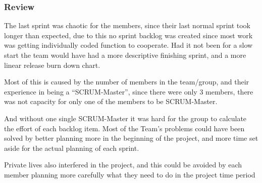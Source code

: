 \documentclass[11pt]{article}
\begin{document}
\subsubsection{Review}
\label{sec-5-1-5}

    The last sprint was chaotic for the members, since their last normal sprint 
    took longer than expected, due to this no sprint backlog was created since 
    most work was getting individually coded function to cooperate.
    Had it not been for a slow start the team would have had a more descriptive
    finishing sprint, and a more linear release burn down chart.
    
    Most of this is caused by the number of members in the team/group, and their 
    experience in being a ``SCRUM-Master'', since there were only 3 members, 
    there was not capacity for only one of the members to be SCRUM-Master.
    
    And without one single SCRUM-Master it was hard for the group to calculate
    the effort of each backlog item. Most of the Team's problems could have been
    solved by better planning more in the beginning of the project, and more time set 
    aside for the actual planning of each sprint.
    
    Private lives also interfered in the project, and this could be avoided by each
    member planning more carefully what they need to do in the project time period 
    
\end{document}

